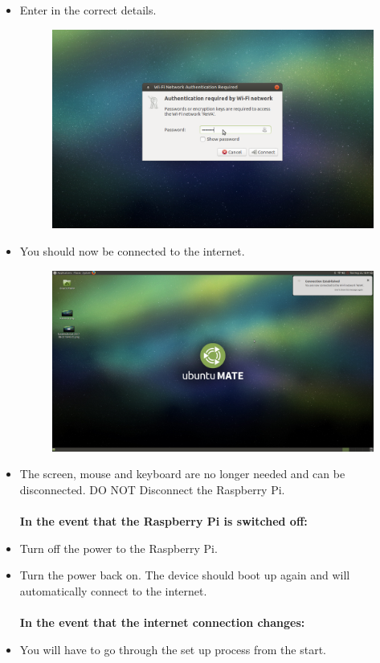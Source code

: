 \begin{itemize}
			\item Enter in the correct details.
\begin{figure}[ht!]
\centering
\begin{minipage}{.9\textwidth}
  \centering
\includegraphics[width=1.0\linewidth]{../images/manual/WifiLogin.png}
\end{minipage}
\end{figure}
			\item You should now be connected to the internet.
\begin{figure}[ht!]
\centering
\begin{minipage}{.9\textwidth}
  \centering
  \includegraphics[width=1.0\linewidth]{../images/manual/connection.png}
\end{minipage}
\end{figure}
			\item The screen, mouse and keyboard are no longer needed and can be disconnected. DO NOT Disconnect the Raspberry Pi.
			\textbf{\\\\In the event that the Raspberry Pi is switched off: }
			
			\item Turn off the power to the Raspberry Pi.
			\item Turn the power back on. The device should boot up again and will automatically connect to the internet.
			\textbf{\\\\In the event that the internet connection changes: }
			\item You will have to go through the set up process from the start.
		\end{itemize}


